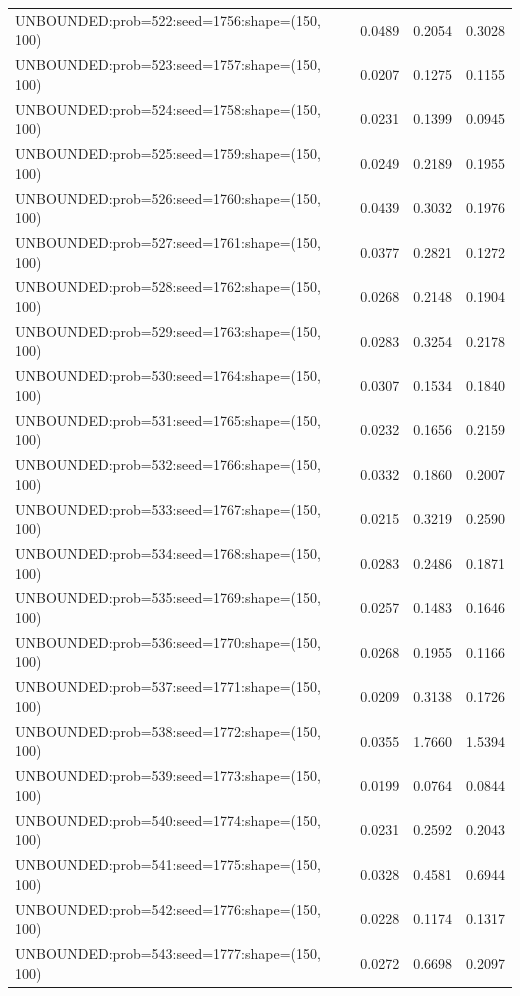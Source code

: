 \begin{longtable}{lccc}
UNBOUNDED:prob=522:seed=1756:shape=(150, 100) &   0.0489 &  0.2054 &  0.3028 \\
UNBOUNDED:prob=523:seed=1757:shape=(150, 100) &   0.0207 &  0.1275 &  0.1155 \\
UNBOUNDED:prob=524:seed=1758:shape=(150, 100) &   0.0231 &  0.1399 &  0.0945 \\
UNBOUNDED:prob=525:seed=1759:shape=(150, 100) &   0.0249 &  0.2189 &  0.1955 \\
UNBOUNDED:prob=526:seed=1760:shape=(150, 100) &   0.0439 &  0.3032 &  0.1976 \\
UNBOUNDED:prob=527:seed=1761:shape=(150, 100) &   0.0377 &  0.2821 &  0.1272 \\
UNBOUNDED:prob=528:seed=1762:shape=(150, 100) &   0.0268 &  0.2148 &  0.1904 \\
UNBOUNDED:prob=529:seed=1763:shape=(150, 100) &   0.0283 &  0.3254 &  0.2178 \\
UNBOUNDED:prob=530:seed=1764:shape=(150, 100) &   0.0307 &  0.1534 &  0.1840 \\
UNBOUNDED:prob=531:seed=1765:shape=(150, 100) &   0.0232 &  0.1656 &  0.2159 \\
UNBOUNDED:prob=532:seed=1766:shape=(150, 100) &   0.0332 &  0.1860 &  0.2007 \\
UNBOUNDED:prob=533:seed=1767:shape=(150, 100) &   0.0215 &  0.3219 &  0.2590 \\
UNBOUNDED:prob=534:seed=1768:shape=(150, 100) &   0.0283 &  0.2486 &  0.1871 \\
UNBOUNDED:prob=535:seed=1769:shape=(150, 100) &   0.0257 &  0.1483 &  0.1646 \\
UNBOUNDED:prob=536:seed=1770:shape=(150, 100) &   0.0268 &  0.1955 &  0.1166 \\
UNBOUNDED:prob=537:seed=1771:shape=(150, 100) &   0.0209 &  0.3138 &  0.1726 \\
UNBOUNDED:prob=538:seed=1772:shape=(150, 100) &   0.0355 &  1.7660 &  1.5394 \\
UNBOUNDED:prob=539:seed=1773:shape=(150, 100) &   0.0199 &  0.0764 &  0.0844 \\
UNBOUNDED:prob=540:seed=1774:shape=(150, 100) &   0.0231 &  0.2592 &  0.2043 \\
UNBOUNDED:prob=541:seed=1775:shape=(150, 100) &   0.0328 &  0.4581 &  0.6944 \\
UNBOUNDED:prob=542:seed=1776:shape=(150, 100) &   0.0228 &  0.1174 &  0.1317 \\
UNBOUNDED:prob=543:seed=1777:shape=(150, 100) &   0.0272 &  0.6698 &  0.2097 \\

\end{longtable}
